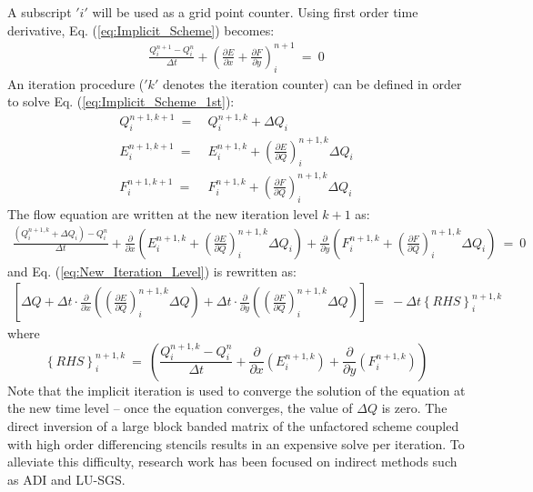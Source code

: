\documentclass[conf]{new-aiaa}
\begin{document}
A subscript $'i'$ will be used as a grid point counter. Using first order time derivative, Eq. (\ref{eq:Implicit_Scheme}) becomes:
\begin{equation}
	\begin{split}
		\label{eq:Implicit_Scheme_1st}
  			\frac{Q_i^{n+1}-Q_i^{n}}{\Delta{t}} +\left(\frac{\partial{E}}{\partial{x}}+\frac{\partial{F}}{\partial{y}}\right)^{n+1}_i~=~0
	\end{split}
\end{equation}
An iteration procedure ($'k'$ denotes the iteration counter) can be defined in order to solve Eq. (\ref{eq:Implicit_Scheme_1st}):
\begin{equation}
	\label{eq:TS_Q_E}
	\begin{split}
	Q_i^{n+1, k+1}~=&~Q_i^{n+1, k}+\Delta{Q}_i \\
	E_i^{n+1, k+1}~=&~E_i^{n+1, k} + \left(\frac{\partial{E}}{\partial{Q}} \right)^{n+1, k}_i\Delta{Q}_i \\
	F_i^{n+1, k+1}~=&~F_i^{n+1, k} + \left(\frac{\partial{F}}{\partial{Q}} \right)^{n+1, k}_i\Delta{Q}_i
	\end{split}
\end{equation}
The flow equation are written at the new iteration level $k+1$ as:
\begin{equation}
	\begin{split}
		\label{eq:New_Iteration_Level}
  			\frac{\left(Q_i^{n+1, k}+\Delta{Q}_i\right)-Q_i^n}{\Delta{t}}+\frac{\partial}{\partial{x}}\left(E_i^{n+1, k} + \left(\frac{\partial{E}}{\partial{Q}} \right)^{n+1, k}_i\Delta{Q}_i\right)+\frac{\partial}{\partial{y}}\left(F_i^{n+1, k} + \left(\frac{\partial{F}}{\partial{Q}} \right)^{n+1, k}_i\Delta{Q}_i\right)~=~0
	\end{split}
\end{equation}
and Eq. (\ref{eq:New_Iteration_Level}) is rewritten as:
\begin{equation}
	\begin{split}
		\label{eq:NS_DeltaForm}
  			\left[\Delta{Q}+\Delta{t}\cdot\frac{\partial}{\partial{x}}\left(\left(\frac{\partial{E}}{\partial{Q}} \right)_i^{n+1,k}\Delta{Q} \right) +\Delta{t}\cdot\frac{\partial}{\partial{y}}\left(\left(\frac{\partial{F}}{\partial{Q}} \right)_i^{n+1,k}\Delta{Q} \right) \right]~=~-\Delta{t}\left\{RHS\right\}_i^{n+1, k}
	\end{split}
\end{equation}
where
\begin{equation*}
	\left\{RHS\right\}_i^{n+1, k}~=~\left(\frac{Q_i^{n+1, k}-Q_i^n}{\Delta{t}}+\frac{\partial}{\partial{x}}\left(E_i^{n+1, k} \right)+\frac{\partial}{\partial{y}}\left(F_i^{n+1, k} \right)\right)
\end{equation*}
Note that the implicit iteration is used to converge the solution of the equation at the new time level – once the equation converges, the value of $\Delta{Q}$ is zero. 
The direct inversion of a large block banded matrix of the unfactored scheme coupled with high order differencing stencils results in an expensive solve per iteration. 
To alleviate this difficulty, research work has been focused on indirect methods such as ADI and LU-SGS. 
\end{document}

